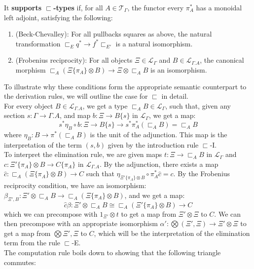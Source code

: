 \begin{defn}
  It \textbf{supports $\sqsubset$-types} if, for all $A \in \mathcal{T}_{\Gamma}$, the functor every $\pi_A^*$ has a monoidal left adjoint, satisfying the following:
  \begin{enumerate}
  \item (Beck-Chevalley): For all pullbacks squares as above, the natural transformation $\sqsubset_Eq^* \to f^*\sqsubset_{E'}$ is a natural isomorphism.
  \item (Frobenius reciprocity): For all objects $\Xi \in \mathcal{L}_{\Gamma}$ and $B \in \mathcal{L}_{\Gamma.A}$, the canonical morphism $\sqsubset_A(\Xi\{\pi_A\} \otimes B) \to \Xi \otimes \sqsubset_AB$ is an isomorphism.
  \end{enumerate}
\end{defn}
To illustrate why these conditions form the appropriate semantic counterpart to the derivation rules, we will outline the case for $\sqsubset$ in detail.\\
For every object $B \in \mathcal{L}_{\Gamma.A}$, we get a type $\sqsubset_AB \in \mathcal{L}_{\Gamma}$, such that, given any section $s : \Gamma \to \Gamma.A$, and map $b : \Xi \to B\{s\}$ in $\mathcal{L}_{\Gamma}$, we get a map:
\[
  s^*\eta_B \circ b : \Xi \to B\{s\} \to s^*\pi_A^*(\sqsubset_AB) = \sqsubset_AB
\]
where $\eta_B : B \to \pi^*(\sqsubset_AB)$ is the unit of the adjunction.
This map is the interpretation of the term $(s, b)$ given by the introduction rule $\sqsubset$-I.\\
To interpret the elimination rule, we are given maps $t : \Xi \to \sqsubset_AB$ in $\mathcal{L}_{\Gamma}$ and $c : \Xi'\{\pi_A\} \otimes B \to C\{\pi_A\}$ in $\mathcal{L}_{\Gamma.A}$. By the adjunction, there exists a map $\hat c : \sqsubset_A(\Xi\{\pi_A\} \otimes B) \to C$ such that $\eta_{\Xi'\{\pi_A\}\otimes B}\circ \pi^*_A\hat c = c$. By the Frobenius reciprocity condition, we have an isomorphism: $\beta_{\Xi', B} : \Xi' \otimes \sqsubset_AB \to \sqsubset_A(\Xi\{\pi_A\} \otimes B)$, and we get a map:
\[
  \hat c \beta : \Xi' \otimes \sqsubset_AB \cong \sqsubset_A(\Xi'\{\pi_A\} \otimes B) \to C
\]
which we can precompose with $1_{\Xi'} \otimes t$ to get a map from $\Xi' \otimes \Xi$ to $C$. We can then precompose with an appropriate isomorphism $\alpha' : \bigotimes (\Xi', \Xi) \to \Xi' \otimes \Xi$ to get a map from $\bigotimes \Xi', \Xi$ to $C$, which will be the interpretation of the elimination term from the rule $\sqsubset$-E.\\
The computation rule boils down to showing that the following triangle commutes:
